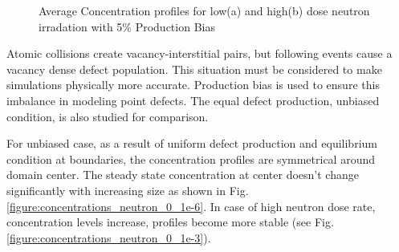 \documentclass[a4paper]{article}
\begin{document}
\begin{figure}[h!]
      \caption{Average Concentration profiles for low(a) and high(b) dose neutron irradation with 5\% Production Bias}
      \label{figure:average_concentrations_neutron_5}
    \end{figure}

    Atomic collisions create vacancy-interstitial pairs, but following events cause a vacancy dense defect population. This situation must be considered to make simulations physically more accurate. Production bias is used to ensure this imbalance in modeling point defects. The equal defect production, unbiased condition, is also studied for comparison.

    For unbiased case, as a result of uniform defect production and equilibrium condition at boundaries, the concentration profiles are symmetrical around domain center. The steady state concentration at center doesn't change significantly with increasing size as shown in Fig. \ref{figure:concentrations_neutron_0_1e-6}. In case of high neutron dose rate, concentration levels increase, profiles become more stable (see Fig. \ref{figure:concentrations_neutron_0_1e-3}).\\
\end{document}
